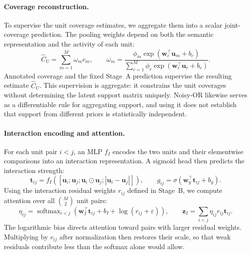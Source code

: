 \paragraph{Coverage reconstruction.}
To supervise the unit coverage estimates, we aggregate them into a scalar
joint-coverage prediction. The pooling weights depend on both the semantic
representation and the activity of each unit:
\begin{equation}
 \widehat C_U=\sum_{m=1}^{M}\omega_m c_m,\qquad
 \omega_m=\frac{\phi_m\exp(\boldsymbol{w}_c^\top\boldsymbol{u}_m+b_c)}
 {\sum_{r=1}^{M}\phi_r\exp(\boldsymbol{w}_c^\top\boldsymbol{u}_r+b_c)}.
 \label{eq:reconstructed-coverage}
\end{equation}
Annotated coverage and the fixed Stage~A prediction supervise the resulting
estimate $\widehat C_U$. This supervision is aggregate: it constrains the unit
coverages without determining the latent support matrix uniquely. Noisy-OR
likewise serves as a differentiable rule for aggregating support, and using it
does not establish that support from different priors is statistically
independent.

\paragraph{Interaction encoding and attention.}
For each unit pair $i<j$, an MLP $f_I$ encodes the two units and their
elementwise comparisons into an interaction representation. A sigmoid head
then predicts the interaction strength:
\begin{equation}
 \boldsymbol{t}_{ij}=f_I([\boldsymbol{u}_i;\boldsymbol{u}_j;
 \boldsymbol{u}_i\odot\boldsymbol{u}_j;|\boldsymbol{u}_i-\boldsymbol{u}_j|]),
 \qquad g_{ij}=\sigma(\boldsymbol{w}_g^\top\boldsymbol{t}_{ij}+b_g).
\end{equation}
Using the interaction residual weights $r_{ij}$ defined in Stage~B, we
compute attention over all $\binom{M}{2}$ unit pairs:
\begin{equation}
 \eta_{ij}=\operatorname{softmax}_{i<j}
 \left(\boldsymbol{w}_I^\top\boldsymbol{t}_{ij}+b_I+
 \log(r_{ij}+\varepsilon)\right),\qquad
 \boldsymbol{z}_I=\sum_{i<j}\eta_{ij}r_{ij}\boldsymbol{t}_{ij}.
 \label{eq:interaction-pooling}
\end{equation}
The logarithmic bias directs attention toward pairs with larger residual
weights. Multiplying by $r_{ij}$ after normalization then restores their
scale, so that weak residuals contribute less than the softmax alone would
allow.

